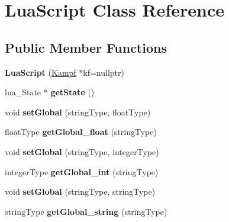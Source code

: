\hypertarget{classLuaScript}{\section{Lua\-Script Class Reference}
\label{classLuaScript}
}
\subsection*{Public Member Functions}
\begin{DoxyCompactItemize}
\item 
\hypertarget{classLuaScript_ab7a4c5c266438af7a29779601e65116a}{{\bfseries Lua\-Script} (\hyperlink{classKampf}{Kampf} $\ast$kf=nullptr)}\label{classLuaScript_ab7a4c5c266438af7a29779601e65116a}

\item 
\hypertarget{classLuaScript_a3785f9562eb9147eea9e610559d8c5ba}{lua\-\_\-\-State $\ast$ {\bfseries get\-State} ()}\label{classLuaScript_a3785f9562eb9147eea9e610559d8c5ba}

\item 
\hypertarget{classLuaScript_a80dcda642440cd5050257f968a29afa1}{void {\bfseries set\-Global} (string\-Type, float\-Type)}\label{classLuaScript_a80dcda642440cd5050257f968a29afa1}

\item 
\hypertarget{classLuaScript_ab1c0517e6f78d903c53da78fc308ac98}{float\-Type {\bfseries get\-Global\-\_\-float} (string\-Type)}\label{classLuaScript_ab1c0517e6f78d903c53da78fc308ac98}

\item 
\hypertarget{classLuaScript_af3a65ea550d01651d77a1b9a3fcc1596}{void {\bfseries set\-Global} (string\-Type, integer\-Type)}\label{classLuaScript_af3a65ea550d01651d77a1b9a3fcc1596}

\item 
\hypertarget{classLuaScript_ab22fa325aa040918157a6ff03bfefd62}{integer\-Type {\bfseries get\-Global\-\_\-int} (string\-Type)}\label{classLuaScript_ab22fa325aa040918157a6ff03bfefd62}

\item 
\hypertarget{classLuaScript_a095c7f45326cc313078cc187cc96aaf6}{void {\bfseries set\-Global} (string\-Type, string\-Type)}\label{classLuaScript_a095c7f45326cc313078cc187cc96aaf6}

\item 
\hypertarget{classLuaScript_adcd37829453619ed0dd5dd599d5785d6}{string\-Type {\bfseries get\-Global\-\_\-string} (string\-Type)}\label{classLuaScript_adcd37829453619ed0dd5dd599d5785d6}


\end{DoxyCompactItemize}
